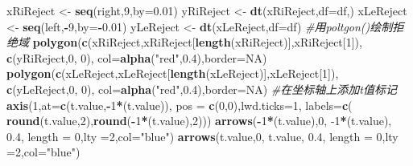\documentclass[
]{article}
\newenvironment{Shaded}{\begin{snugshade}}{\end{snugshade}}
\newcommand{\CommentTok}[1]{\textcolor[rgb]{0.56,0.35,0.01}{\textit{#1}}}
\newcommand{\DataTypeTok}[1]{\textcolor[rgb]{0.13,0.29,0.53}{#1}}
\newcommand{\DecValTok}[1]{\textcolor[rgb]{0.00,0.00,0.81}{#1}}
\newcommand{\FloatTok}[1]{\textcolor[rgb]{0.00,0.00,0.81}{#1}}
\newcommand{\KeywordTok}[1]{\textcolor[rgb]{0.13,0.29,0.53}{\textbf{#1}}}
\newcommand{\NormalTok}[1]{#1}
\newcommand{\OperatorTok}[1]{\textcolor[rgb]{0.81,0.36,0.00}{\textbf{#1}}}
\newcommand{\OtherTok}[1]{\textcolor[rgb]{0.56,0.35,0.01}{#1}}
\newcommand{\StringTok}[1]{\textcolor[rgb]{0.31,0.60,0.02}{#1}}
\begin{document}
\begin{Shaded}
\begin{Highlighting}[]
\NormalTok{xRiReject <-}\StringTok{ }\KeywordTok{seq}\NormalTok{(right,}\DecValTok{9}\NormalTok{,}\DataTypeTok{by=}\FloatTok{0.01}\NormalTok{)}
\NormalTok{yRiReject <-}\StringTok{ }\KeywordTok{dt}\NormalTok{(xRiReject,}\DataTypeTok{df=}\NormalTok{df,)}
\NormalTok{xLeReject <-}\StringTok{ }\KeywordTok{seq}\NormalTok{(left,}\OperatorTok{-}\DecValTok{9}\NormalTok{,}\DataTypeTok{by=}\OperatorTok{-}\FloatTok{0.01}\NormalTok{)}
\NormalTok{yLeReject <-}\StringTok{ }\KeywordTok{dt}\NormalTok{(xLeReject,}\DataTypeTok{df=}\NormalTok{df)}
\CommentTok{#用poltgon()绘制拒绝域}
\KeywordTok{polygon}\NormalTok{(}\KeywordTok{c}\NormalTok{(xRiReject,xRiReject[}\KeywordTok{length}\NormalTok{(xRiReject)],xRiReject[}\DecValTok{1}\NormalTok{]),}
        \KeywordTok{c}\NormalTok{(yRiReject,}\DecValTok{0}\NormalTok{, }\DecValTok{0}\NormalTok{), }\DataTypeTok{col=}\KeywordTok{alpha}\NormalTok{(}\StringTok{"red"}\NormalTok{,}\FloatTok{0.4}\NormalTok{),}\DataTypeTok{border=}\OtherTok{NA}\NormalTok{)}
\KeywordTok{polygon}\NormalTok{(}\KeywordTok{c}\NormalTok{(xLeReject,xLeReject[}\KeywordTok{length}\NormalTok{(xLeReject)],xLeReject[}\DecValTok{1}\NormalTok{]),}
        \KeywordTok{c}\NormalTok{(yLeReject,}\DecValTok{0}\NormalTok{, }\DecValTok{0}\NormalTok{), }\DataTypeTok{col=}\KeywordTok{alpha}\NormalTok{(}\StringTok{"red"}\NormalTok{,}\FloatTok{0.4}\NormalTok{),}\DataTypeTok{border=}\OtherTok{NA}\NormalTok{)}
\CommentTok{#在坐标轴上添加t值标记}
\KeywordTok{axis}\NormalTok{(}\DecValTok{1}\NormalTok{,}\DataTypeTok{at=}\KeywordTok{c}\NormalTok{(t.value,}\OperatorTok{-}\DecValTok{1}\OperatorTok{*}\NormalTok{(t.value)),}
     \DataTypeTok{pos =} \KeywordTok{c}\NormalTok{(}\DecValTok{0}\NormalTok{,}\DecValTok{0}\NormalTok{),}\DataTypeTok{lwd.ticks=}\DecValTok{1}\NormalTok{,}
     \DataTypeTok{labels=}\KeywordTok{c}\NormalTok{( }\KeywordTok{round}\NormalTok{(t.value,}\DecValTok{2}\NormalTok{),}\KeywordTok{round}\NormalTok{(}\OperatorTok{-}\DecValTok{1}\OperatorTok{*}\NormalTok{(t.value),}\DecValTok{2}\NormalTok{)))}
\KeywordTok{arrows}\NormalTok{(}\OperatorTok{-}\DecValTok{1}\OperatorTok{*}\NormalTok{(t.value),}\DecValTok{0}\NormalTok{, }\DecValTok{-1}\OperatorTok{*}\NormalTok{(t.value), }\FloatTok{0.4}\NormalTok{, }\DataTypeTok{length =} \DecValTok{0}\NormalTok{,}\DataTypeTok{lty =}\DecValTok{2}\NormalTok{,}\DataTypeTok{col=}\StringTok{"blue"}\NormalTok{)}
\KeywordTok{arrows}\NormalTok{(t.value,}\DecValTok{0}\NormalTok{, t.value, }\FloatTok{0.4}\NormalTok{, }\DataTypeTok{length =} \DecValTok{0}\NormalTok{,}\DataTypeTok{lty =}\DecValTok{2}\NormalTok{,}\DataTypeTok{col=}\StringTok{"blue"}\NormalTok{)}
\end{Highlighting}
\end{Shaded}
\end{document}
